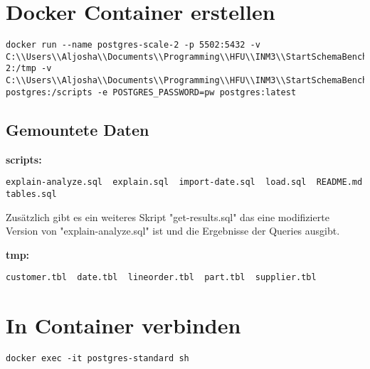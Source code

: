 
\section{Docker Container erstellen}
\begin{lstlisting}[language=terminal, caption=Ohne Config, label=code:ohneconfig]
docker run --name postgres-scale-2 -p 5502:5432 -v C:\\Users\\Aljosha\\Documents\\Programming\\HFU\\INM3\\StartSchemaBenchmark\\generated\\scale-2:/tmp -v C:\\Users\\Aljosha\\Documents\\Programming\\HFU\\INM3\\StartSchemaBenchmark\\Postgres\\ssb-postgres:/scripts -e POSTGRES_PASSWORD=pw postgres:latest
\end{lstlisting}

\subsection{Gemountete Daten}
\noindent \textbf{scripts:}
\begin{lstlisting}[language=terminal, caption=Scripts im Verzeichnis, label=code:scriptfiles]
explain-analyze.sql  explain.sql  import-date.sql  load.sql  README.md  tables.sql
\end{lstlisting}
Zusätzlich gibt es ein weiteres Skript "get-results.sql" das eine modifizierte Version von "explain-analyze.sql" ist und die Ergebnisse der Queries ausgibt.

\noindent \textbf{tmp:}
\begin{lstlisting}[language=terminal, caption=Temporäre Dateien, label=code:tmpfiles]
customer.tbl  date.tbl  lineorder.tbl  part.tbl  supplier.tbl
\end{lstlisting}

\section{In Container verbinden}
\begin{lstlisting}[language=terminal, caption=In Container verbinden, label=code:connectcontainer]
docker exec -it postgres-standard sh
\end{lstlisting}

